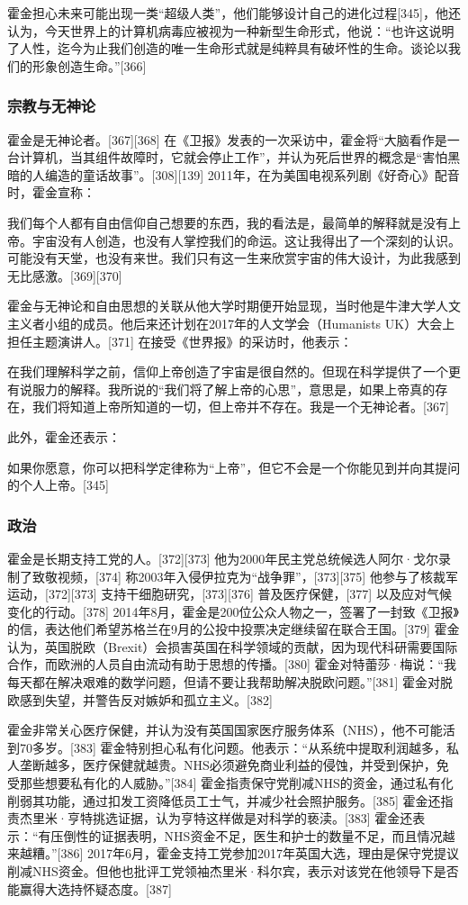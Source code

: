 霍金担心未来可能出现一类“超级人类”，他们能够设计自己的进化过程[345]，他还认为，今天世界上的计算机病毒应被视为一种新型生命形式，他说：“也许这说明了人性，迄今为止我们创造的唯一生命形式就是纯粹具有破坏性的生命。谈论以我们的形象创造生命。”[366]
\subsubsection{宗教与无神论}  
霍金是无神论者。[367][368] 在《卫报》发表的一次采访中，霍金将“大脑看作是一台计算机，当其组件故障时，它就会停止工作”，并认为死后世界的概念是“害怕黑暗的人编造的童话故事”。[308][139] 2011年，在为美国电视系列剧《好奇心》配音时，霍金宣称：

我们每个人都有自由信仰自己想要的东西，我的看法是，最简单的解释就是没有上帝。宇宙没有人创造，也没有人掌控我们的命运。这让我得出了一个深刻的认识。可能没有天堂，也没有来世。我们只有这一生来欣赏宇宙的伟大设计，为此我感到无比感激。[369][370]

霍金与无神论和自由思想的关联从他大学时期便开始显现，当时他是牛津大学人文主义者小组的成员。他后来还计划在2017年的人文学会（Humanists UK）大会上担任主题演讲人。[371] 在接受《世界报》的采访时，他表示：

在我们理解科学之前，信仰上帝创造了宇宙是很自然的。但现在科学提供了一个更有说服力的解释。我所说的“我们将了解上帝的心思”，意思是，如果上帝真的存在，我们将知道上帝所知道的一切，但上帝并不存在。我是一个无神论者。[367]

此外，霍金还表示：

如果你愿意，你可以把科学定律称为“上帝”，但它不会是一个你能见到并向其提问的个人上帝。[345]
\subsubsection{政治}  
霍金是长期支持工党的人。[372][373] 他为2000年民主党总统候选人阿尔·戈尔录制了致敬视频，[374] 称2003年入侵伊拉克为“战争罪”，[373][375] 他参与了核裁军运动，[372][373] 支持干细胞研究，[373][376] 普及医疗保健，[377] 以及应对气候变化的行动。[378] 2014年8月，霍金是200位公众人物之一，签署了一封致《卫报》的信，表达他们希望苏格兰在9月的公投中投票决定继续留在联合王国。[379] 霍金认为，英国脱欧（Brexit）会损害英国在科学领域的贡献，因为现代科研需要国际合作，而欧洲的人员自由流动有助于思想的传播。[380] 霍金对特蕾莎·梅说：“我每天都在解决艰难的数学问题，但请不要让我帮助解决脱欧问题。”[381] 霍金对脱欧感到失望，并警告反对嫉妒和孤立主义。[382]

霍金非常关心医疗保健，并认为没有英国国家医疗服务体系（NHS），他不可能活到70多岁。[383] 霍金特别担心私有化问题。他表示：“从系统中提取利润越多，私人垄断越多，医疗保健就越贵。NHS必须避免商业利益的侵蚀，并受到保护，免受那些想要私有化的人威胁。”[384] 霍金指责保守党削减NHS的资金，通过私有化削弱其功能，通过扣发工资降低员工士气，并减少社会照护服务。[385] 霍金还指责杰里米·亨特挑选证据，认为亨特这样做是对科学的亵渎。[383] 霍金还表示：“有压倒性的证据表明，NHS资金不足，医生和护士的数量不足，而且情况越来越糟。”[386] 2017年6月，霍金支持工党参加2017年英国大选，理由是保守党提议削减NHS资金。但他也批评工党领袖杰里米·科尔宾，表示对该党在他领导下是否能赢得大选持怀疑态度。[387]

